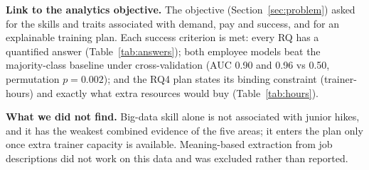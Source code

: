 \textbf{Link to the analytics objective.} The objective (Section~\ref{sec:problem}) asked for
the skills and traits associated with demand, pay and success, and for an explainable training
plan. Each success criterion is met: every RQ has a quantified answer (Table~\ref{tab:answers});
both employee models beat the majority-class baseline under cross-validation (AUC 0.90 and 0.96 vs
0.50, permutation $p = 0.002$); and the RQ4 plan states its binding constraint (trainer-hours) and
exactly what extra resources would buy (Table~\ref{tab:hours}).

\textbf{What we did not find.} Big-data skill alone is not associated with junior hikes, and it has
the weakest combined evidence of the five areas; it enters the plan only once extra trainer capacity
is available. Meaning-based extraction from job descriptions did not work on this data and was
excluded rather than reported.
